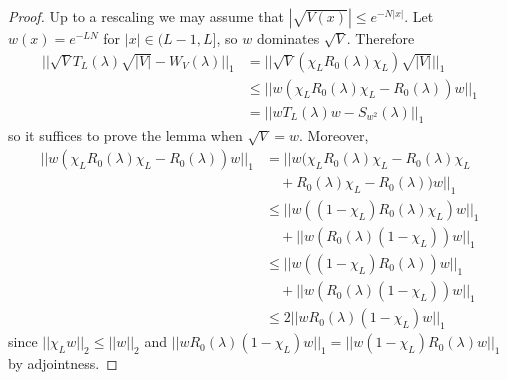 \documentclass[12pt]{report}
\theoremstyle{definition}
\begin{document}
\begin{proof}
Up to a rescaling we may assume that $|\sqrt{V(x)}| \leq e^{-N|x|}$. Let $w(x) = e^{-LN}$ for $|x| \in (L-1, L]$, so $w$ dominates $\sqrt V$. Therefore
\begin{align*}
||\sqrt V T_L(\lambda) \sqrt{|V|} - W_V(\lambda)||_1 &= ||\sqrt V(\chi_L R_0(\lambda)\chi_L)\sqrt{|V|}||_1\\
  & \leq ||w(\chi_L R_0(\lambda) \chi_L - R_0(\lambda))w||_1 \\
  &= ||wT_L(\lambda)w - S_{w^2}(\lambda)||_1
\end{align*}
so it suffices to prove the lemma when $\sqrt V = w$. Moreover,
\begin{align*}
||w(\chi_L R_0(\lambda) \chi_L - R_0(\lambda))w||_1 &= ||w(\chi_L R_0(\lambda) \chi_L - R_0(\lambda)\chi_L \\
  &\quad+ R_0(\lambda)\chi_L - R_0(\lambda))w||_1\\
  &\leq ||w((1 - \chi_L)R_0(\lambda)\chi_L)w||_1 \\
  &\quad+ ||w(R_0(\lambda)(1 - \chi_L))w||_1\\
  &\leq ||w((1 - \chi_L)R_0(\lambda))w||_1 \\
  &\quad + ||w(R_0(\lambda)(1 - \chi_L))w||_1\\
  &\leq 2||wR_0(\lambda)(1 - \chi_L)w||_1
\end{align*}
since $||\chi_Lw||_2 \leq ||w||_2$ and $||wR_0(\lambda)(1 - \chi_L)w||_1 = ||w(1 - \chi_L)R_0(\lambda)w||_1$ by adjointness.


\end{proof}
\end{document}
